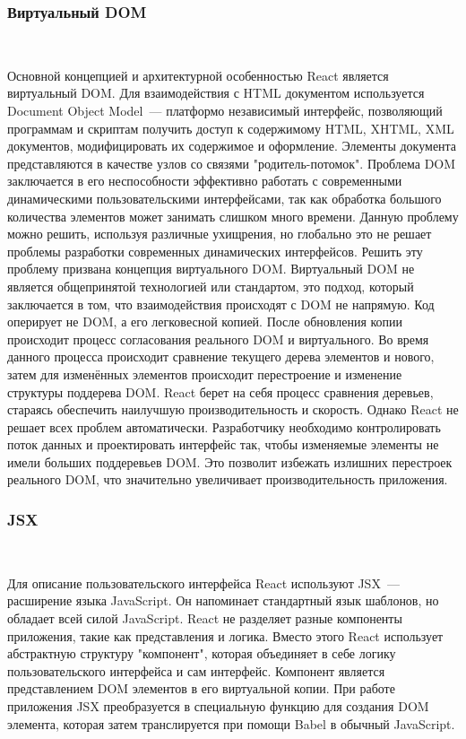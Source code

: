 \subsubsection{Виртуальный DOM}~\par
Основной концепцией и архитектурной особенностью React является виртуальный DOM\cite{react2}. 
Для взаимодействия с HTML документом используется Document Object Model~--- платформо независимый интерфейс, позволяющий программам и скриптам получить доступ к содержимому HTML, XHTML, XML документов, модифицировать их содержимое и оформление. 
Элементы документа представляются в качестве узлов со связями "родитель-потомок". 
Проблема DOM заключается в его неспособности эффективно работать с современными динамическими пользовательскими интерфейсами, так как обработка большого количества элементов может занимать слишком много времени. 
Данную проблему можно решить, используя различные ухищрения, но глобально это не решает проблемы разработки современных динамических интерфейсов. 
Решить эту проблему призвана концепция виртуального DOM. 
Виртуальный DOM не является общепринятой технологией или стандартом, это подход, который заключается в том, что взаимодействия происходят с DOM не напрямую. 
Код оперирует не DOM, а его легковесной копией. 
После обновления копии происходит процесс согласования реального DOM и виртуального. 
Во время данного процесса происходит сравнение текущего дерева элементов и нового, затем для изменённых элементов происходит перестроение и изменение структуры поддерева DOM. 
React берет на себя процесс сравнения деревьев, стараясь обеспечить наилучшую производительность и скорость. 
Однако React не решает всех проблем автоматически. 
Разработчику необходимо контролировать поток данных и проектировать интерфейс так, чтобы изменяемые элементы не имели больших поддеревьев DOM. 
Это позволит избежать излишних перестроек реального DOM, что значительно увеличивает производительность приложения.
 
\subsubsection{JSX}~\par
Для описание пользовательского интерфейса React используют JSX~--- расширение языка JavaScript. 
Он напоминает стандартный язык шаблонов, но обладает всей силой JavaScript. 
React не разделяет разные компоненты приложения, такие как представления и логика. 
Вместо этого React использует абстрактную структуру "компонент", которая объединяет в себе логику пользовательского интерфейса и сам интерфейс. 
Компонент является представлением DOM элементов в его виртуальной копии.
При работе приложения JSX преобразуется в специальную функцию для создания DOM элемента, которая затем транслируется при помощи Babel в обычный JavaScript.


